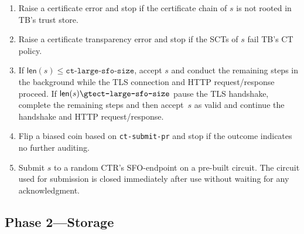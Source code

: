 \begin{enumerate}
    \item Raise a certificate error and stop if the certificate chain of $s$
        is not rooted in TB's trust store.
    \item Raise a certificate transparency error and stop if the SCTs of $s$
        fail TB's CT policy.
    \item If $\mathsf{len}(s) \le \texttt{ct-large-sfo-size}$, accept $s$ and
        conduct the remaining steps in the background while the TLS connection
        and HTTP request/response proceed. If $\mathsf{len}(s) \gte \texttt{ct-large-sfo-size}$ pause the TLS handshake, complete the remaining steps and then
        accept~$s$ as valid and continue the handshake and HTTP request/response.
    \item Flip a biased coin based on \texttt{ct-submit-pr} and stop if the
        outcome indicates no further auditing.
    \item Submit $s$ to a random CTR's SFO-endpoint on a pre-built circuit.
        The circuit used for submission is closed immediately after use without
        waiting for any acknowledgment.
\end{enumerate}

\subsection{Phase 2---Storage} \label{sec:base:phase2}
